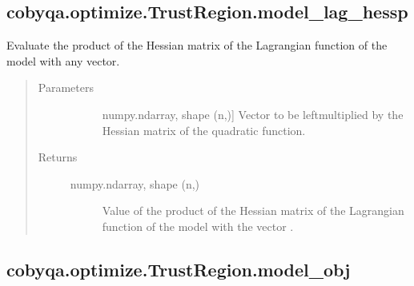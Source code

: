 \documentclass[letterpaper,10pt,english]{sphinxmanual}
\begin{document}
\begin{fulllineitems}
\subsection{cobyqa.optimize.TrustRegion.model\_lag\_hessp}
\label{\detokenize{refs/generated/cobyqa.optimize.TrustRegion.model_lag_hessp:cobyqa-optimize-trustregion-model-lag-hessp}}\label{\detokenize{refs/generated/cobyqa.optimize.TrustRegion.model_lag_hessp::doc}}

\begin{fulllineitems}
\label{\detokenize{refs/generated/cobyqa.optimize.TrustRegion.model_lag_hessp:cobyqa.optimize.TrustRegion.model_lag_hessp}}
\sphinxAtStartPar
Evaluate the product of the Hessian matrix of the Lagrangian function of
the model with any vector.
\begin{quote}\begin{description}
\item[{Parameters}] \leavevmode\begin{description}
\item[{}] \leavevmode{[}numpy.ndarray, shape (n,){]}
\sphinxAtStartPar
Vector to be left\sphinxhyphen{}multiplied by the Hessian matrix of the quadratic
function.

\end{description}

\item[{Returns}] \leavevmode\begin{description}
\item[{numpy.ndarray, shape (n,)}] \leavevmode
\sphinxAtStartPar
Value of the product of the Hessian matrix of the Lagrangian
function of the model with the vector .

\end{description}

\end{description}\end{quote}

\end{fulllineitems}



\subsection{cobyqa.optimize.TrustRegion.model\_obj}
\label{\detokenize{refs/generated/cobyqa.optimize.TrustRegion.model_obj:cobyqa-optimize-trustregion-model-obj}}\label{\detokenize{refs/generated/cobyqa.optimize.TrustRegion.model_obj::doc}}


\end{fulllineitems}
\end{document}
